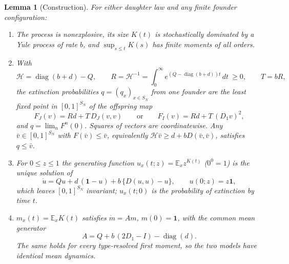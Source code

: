 \documentclass[11pt]{article}
\newtheorem{lemma}[theorem]{Lemma}
\theoremstyle{remark}
\newcommand{\one}{\mathbf 1}
\newcommand{\E}{\mathbb E}
\newcommand{\diag}{\operatorname{diag}}
\newcommand{\Hm}{\mathcal H}
\begin{document}
\begin{lemma}[Construction]\label{lem:construction}
For either daughter law and any finite founder configuration:
\begin{enumerate}
\item[(i)] The process is nonexplosive, its size $K(t)$ is stochastically
dominated by a Yule process of rate $b$, and $\sup_{s\le t}K(s)$ has finite
moments of all orders.
\item[(ii)] With
\begin{equation}\label{eq:R}
 \Hm=\diag(b+d)-Q,\qquad R=\Hm^{-1}=\int_0^\infty e^{(Q-\diag(b+d))t}\,dt\ \ge0,\qquad T=bR,
\end{equation}
the extinction probabilities $q=(q_x)_{x\in S_N}$ from one founder are the
least fixed point in $[0,1]^{S_N}$ of the offspring map
\begin{equation}\label{eq:F}
 F_J(v)=Rd+T\,D_J(v,v)\qquad\text{or}\qquad F_I(v)=Rd+T\,(D_1v)^2 ,
\end{equation}
and $q=\lim_nF^n(0)$. Squares of vectors are coordinatewise. Any
$\bar v\in[0,1]^{S_N}$ with $F(\bar v)\le\bar v$, equivalently
$\Hm\bar v\ge d+bD(\bar v,\bar v)$, satisfies $q\le\bar v$.
\item[(iii)] For $0\le z\le1$ the generating function
$u_x(t;z)=\E_xz^{K(t)}$ \textup{(}$0^0=1$\textup{)} is the unique solution of
\begin{equation}\label{eq:ODE}
 \dot u=Qu+d\,(\one-u)+b\,\{D(u,u)-u\},\qquad u(0;z)=z\one ,
\end{equation}
which leaves $[0,1]^{S_N}$ invariant; $u_x(t;0)$ is the probability of
extinction by time $t$.
\item[(iv)] $m_x(t)=\E_xK(t)$ satisfies $\dot m=Am$, $m(0)=\one$, with the
\emph{common} mean generator
\begin{equation}\label{eq:mean}
 A=Q+b\,(2D_1-I)-\diag(d).
\end{equation}
The same holds for every type-resolved first moment, so the two models have
identical mean dynamics.
\end{enumerate}
\end{lemma}
\end{document}
